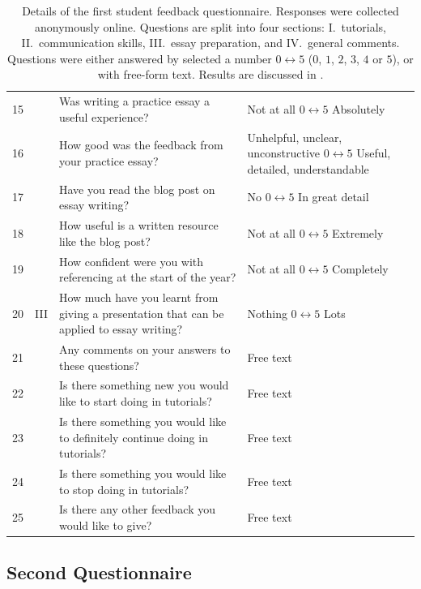 \begin{table}
\begin{tabular}{c c p{2in} p{2in}}
\midrule
15 & \multirow{15}{*}{III} & Was writing a practice essay a useful experience? & Not at all $0 \leftrightarrow 5$ Absolutely \\
16 &	& How good was the feedback from your practice essay? & Unhelpful, unclear, unconstructive $0 \leftrightarrow 5$ Useful, detailed, understandable \\
17 &	& Have you read the blog post on essay writing? & No $0 \leftrightarrow 5$ In great detail \\
18 &	& How useful is a written resource like the blog post? & Not at all $0 \leftrightarrow 5$ Extremely \\
19 &	& How confident were you with referencing at the start of the year? & Not at all $0 \leftrightarrow 5$ Completely \\
20 &	& How much have you learnt from giving a presentation that can be applied to essay writing? & Nothing $0 \leftrightarrow 5$ Lots \\
21 &	& Any comments on your answers to these questions? & Free text \\
\midrule
22 & \multirow{8}{*}{IV} & Is there something new you would like to start doing in tutorials? & Free text \\
23 &	& Is there something you would like to definitely continue doing in tutorials? & Free text \\
24 &	& Is there something you would like to stop doing in tutorials? & Free text \\
25 &	& Is there any other feedback you would like to give? & Free text \\
 \bottomrule
\end{tabular}
\caption{Details of the first student feedback questionnaire. Responses were collected anonymously online. Questions are split into four sections: I.\ tutorials, II.\ communication skills, III.\ essay preparation, and IV.\ general comments. Questions were either answered by selected a number $0 \leftrightarrow 5$ ($0$, $1$, $2$, $3$, $4$ or $5$), or with free-form text. Results are discussed in .}\label{tab:form1}
\end{table}

\subsection{Second Questionnaire}\label{sec:form2}

